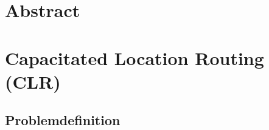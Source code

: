 \documentclass[a4paper,ngerman,12pt,bibtotoc]{scrartcl}
\theoremstyle{definition}
\theoremstyle{plain}
\theoremstyle{remark}
\begin{document}


\tableofcontents

\newpage
	
\section*{\glqq Abstract\grqq}



\section{Capacitated Location Routing (CLR)}

	\subsection{Problemdefinition}
\end{document}
